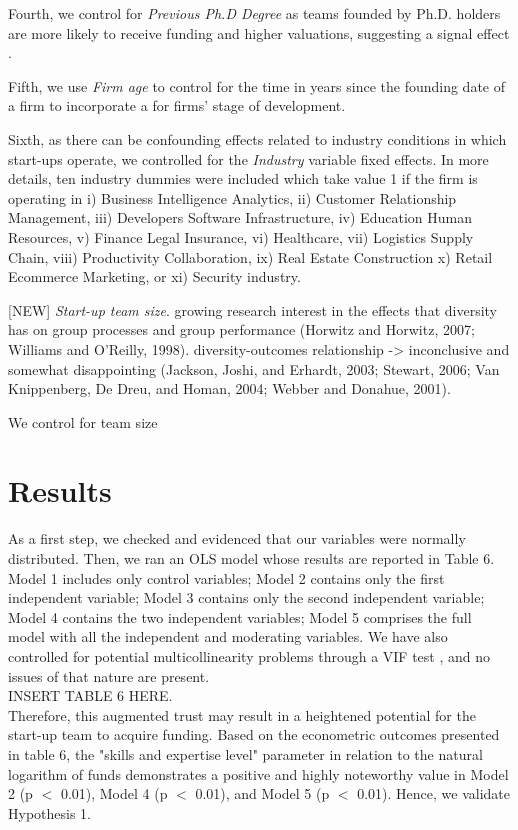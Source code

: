 \documentclass[12pt]{article}
\begin{document}
Fourth, we control for \textit{Previous Ph.D Degree} as teams founded by Ph.D. holders are more likely to receive funding and higher valuations, suggesting a signal effect \citep{hsu2007experienced}.

Fifth, we use \textit{Firm age} to control for the time in years since the founding date of a firm to incorporate a for firms’ stage of development.

Sixth, as there can be confounding effects related to industry conditions in which start-ups operate, we controlled for the \textit{Industry} variable fixed effects. In more details, ten industry dummies were included which take value 1 if the firm is operating in i) Business Intelligence Analytics, ii) Customer Relationship Management, iii) Developers Software Infrastructure, iv) Education Human Resources, v) Finance Legal Insurance, vi) Healthcare, vii) Logistics Supply Chain, viii) Productivity Collaboration, ix) Real Estate Construction x) Retail Ecommerce Marketing, or xi) Security industry.

[NEW] \textit{Start-up team size}. growing research interest in the effects that diversity has on group processes and group performance (Horwitz and Horwitz, 2007; Williams and O’Reilly, 1998).  diversity-outcomes relationship -> inconclusive and somewhat disappointing (Jackson, Joshi, and Erhardt, 2003; Stewart, 2006; Van Knippenberg, De Dreu, and Homan, 2004; Webber and Donahue, 2001).

We control for team size

\section{Results}

As a first step, we checked and evidenced that our variables were normally distributed. Then, we ran an OLS model whose results are reported in Table 6\label{table6}. Model 1 includes only control variables; Model 2 contains only the first independent variable; Model 3 contains only the second independent variable; Model 4 contains the two independent variables; Model 5 comprises the full model with all the independent and moderating variables. We have also controlled for potential multicollinearity problems through a VIF test \citep{james2013introduction}, and no issues of that nature are present. \\

INSERT TABLE 6 HERE. \\

Therefore, this augmented trust may result in a heightened potential for the start-up team to acquire funding. Based on the econometric outcomes presented in table 6, the "skills and expertise level" parameter in relation to the natural logarithm of funds demonstrates a positive and highly noteworthy value in Model 2 (p $<$ 0.01), Model 4 (p $<$ 0.01), and Model 5 (p $<$ 0.01). Hence, we validate Hypothesis 1.
\end{document}
